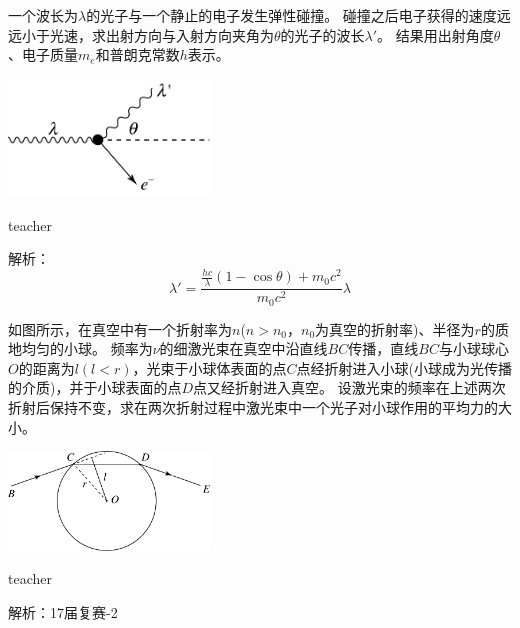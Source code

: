 \begin{example}
一个波长为$ \lambda$的光子与一个静止的电子发生弹性碰撞。
碰撞之后电子获得的速度远远小于光速，求出射方向与入射方向夹角为$\theta$的光子的波长$\lambda'$。
结果用出射角度$\theta$、电子质量$m_e$和普朗克常数$h$表示。
\begin{flushright}
\includegraphics[width=0.4\textwidth]{images/particle-1.pdf}
\end{flushright}
\begin{taggedblock}{teacher}

解析：
\[
\lambda '=\frac{\frac{hc}{\lambda}(1-\cos\theta)+m_0 c^2}{m_0 c^2}\lambda
\]
\end{taggedblock}
\end{example}


\begin{example}
如图所示，在真空中有一个折射率为$n$($n>n_0$，$n_0$为真空的折射率)、半径为$r$的质地均匀的小球。
频率为$\nu$的细激光束在真空中沿直线$BC$传播，直线$BC$与小球球心$O$的距离为$l(l<r)$，光束于小球体表面的点$C$点经折射进入小球(小球成为光传播的介质)，并于小球表面的点$D$点又经折射进入真空。
设激光束的频率在上述两次折射后保持不变，求在两次折射过程中激光束中一个光子对小球作用的平均力的大小。
\begin{flushright}
\includegraphics[width=0.4\textwidth]{images/particle-2.pdf}
\end{flushright}

\begin{taggedblock}{teacher}

解析：17届复赛-2
\end{taggedblock}
\end{example}

